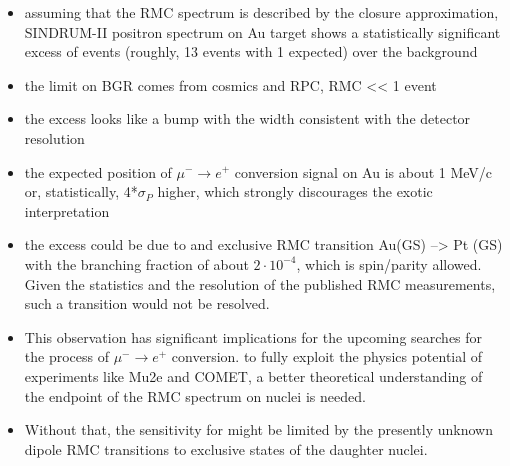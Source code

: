 \documentclass[12pt]{article}
\begin{document}
\begin{itemize}
\item
  assuming that the RMC spectrum is described by the closure approximation,
  SINDRUM-II positron spectrum on Au target shows a statistically significant
  excess of events (roughly, 13 events with 1 expected) over the background
\item
  the limit on BGR comes from cosmics and RPC, RMC << 1  event
\item
  the excess looks like a bump with the width consistent with the detector
  resolution
\item
  the expected position of $\mu^- \rightarrow e^+$ conversion signal on Au is
  about 1 MeV/c or, statistically, 4*$\sigma_P$ higher, which strongly discourages
  the exotic interpretation
\item
  the excess could be due to and exclusive RMC transition Au(GS) --> Pt (GS)
  with the branching fraction of about $2\cdot10^{-4}$, which is spin/parity
  allowed. Given the statistics and the resolution of the published RMC
  measurements, such a transition would not be resolved. 
\item
  This observation has significant implications for the upcoming
  searches
  for the process of $\mu^- \rightarrow e^+$ conversion. 
  to fully exploit the physics potential of experiments like Mu2e and COMET,
  a better theoretical understanding of the endpoint of the RMC spectrum
  on nuclei is needed. 
\item
  Without that, the sensitivity for might be limited by the presently unknown
  dipole RMC transitions to exclusive states of the daughter nuclei. 
\end{itemize}

% 
% 
% 


\end{document}
